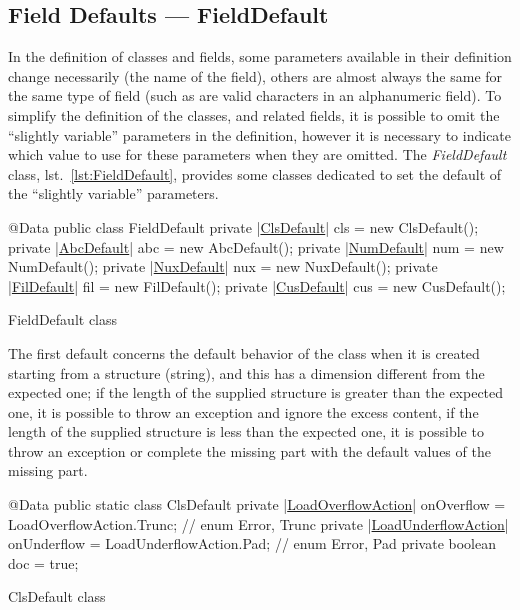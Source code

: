 \subsection{Field Defaults --- FieldDefault}
In the definition of classes and fields, some parameters available in their 
definition change necessarily (the name of the field), others are almost always 
the same for the same type of field (such as are valid characters in an 
alphanumeric field).
To simplify the definition of the classes, and related fields, it is possible to
omit the ``slightly variable'' parameters in the definition, however it is 
necessary to indicate which value to use for these parameters when they are 
omitted. 
The \textsl{FieldDefault} class, lst.~\ref{lst:FieldDefault}, provides some 
classes dedicated to set the default of the ``slightly variable'' parameters.

\begin{elisting}[!htb]
\begin{javacode}
@Data
public class FieldDefault {
    private |\hyperref[lst:ClsDefault]{ClsDefault}| cls = new ClsDefault();
    private |\hyperref[lst:AbcDefault]{AbcDefault}| abc = new AbcDefault();
    private |\hyperref[lst:NumDefault]{NumDefault}| num = new NumDefault();
    private |\hyperref[lst:NuxDefault]{NuxDefault}| nux = new NuxDefault();
    private |\hyperref[lst:FilDefault]{FilDefault}| fil = new FilDefault();
    private |\hyperref[lst:CusDefault]{CusDefault}| cus = new CusDefault();
}
\end{javacode}
\caption{FieldDefault class}
\label{lst:FieldDefault}
\end{elisting}
The first default concerns the default behavior of the class when it is created 
starting from a structure (string), and this has a dimension different from the 
expected one; if the length of the supplied structure is greater than the 
expected one, it is possible to throw an exception and ignore the excess 
content, if the length of the supplied structure is less than the expected one, 
it is possible to throw an exception or complete the missing part with the 
default values of the missing part.

\begin{elisting}[!htb]
\begin{javacode}
@Data
public static class ClsDefault {
    private |\hyperref[lst:LoadOverflowAction]{LoadOverflowAction}| onOverflow = LoadOverflowAction.Trunc;   // enum {Error, Trunc}
    private |\hyperref[lst:LoadUnderflowAction]{LoadUnderflowAction}| onUnderflow = LoadUnderflowAction.Pad;  // enum {Error, Pad}
    private boolean doc = true;
}
\end{javacode}
\caption{ClsDefault class}
\label{lst:ClsDefault}
\end{elisting}


